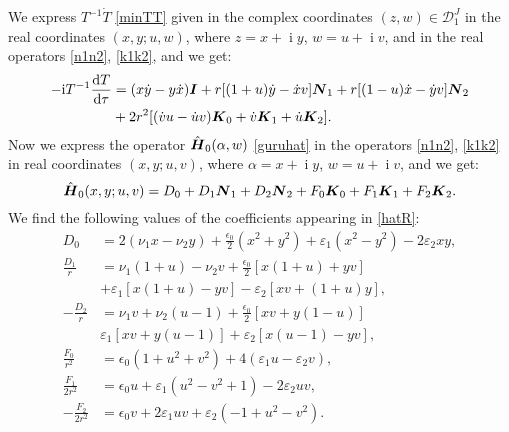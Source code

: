 \documentclass[12pt]{amsart}
\numberwithin{equation}{section}
\theoremstyle{definition}
\begin{document}
We express  $T^{-1}\dot{T}$ \eqref{minTT}  given in the complex
coordinates $(z,w)\in{{\mathcal{{D}}}}^J_1$ in the real coordinates $(x,y;u,w)$,
where 
$z=x+{\operatorname{i}} y$, $w=u+{\operatorname{i}} v$, and in the real operators \eqref{n1n2}, \eqref{k1k2}, and we get:
\begin{equation}\label{minTT1}
\begin{split}
-{\operatorname{i}} T^{-1}\frac{{\operatorname{d}} T}{{\operatorname{d}} \tau } & =(x\dot{y}-y\dot{x}){{\mbox{\boldmath{${I}$}}}}+r[(1+u)\dot{y}-\dot{x}v]{{\mbox{\boldmath{${N}$}}}}_1+r[(1-u)\dot{x}-\dot{y}v]{{\mbox{\boldmath{${N}$}}}}_2\\
~~~&  +2r^2[(\dot{v}u-\dot{u}v){{\mbox{\boldmath{${K}$}}}}_0+\dot{v}{{\mbox{\boldmath{${K}$}}}}_1+\dot{u}{{\mbox{\boldmath{${K}$}}}}_2].
\end{split}
\end{equation}
Now we express  the operator $\hat{{{\mbox{\boldmath{${H}$}}}}}_0(\alpha,w)$ \eqref{guruhat} in the
operators \eqref{n1n2}, \eqref{k1k2} in real coordinates $(x,y;u,v)$, where
$\alpha=x+{\operatorname{i}} y$, $w=u+{\operatorname{i}} v$, and we get:
\begin{equation}\label{hatR}
\hat{{{\mbox{\boldmath{${H}$}}}}}_0(x,y;u,v)=D_0+D_1{{\mbox{\boldmath{${N}$}}}}_1+ D_2{{\mbox{\boldmath{${N}$}}}}_2+F_0{{\mbox{\boldmath{${K}$}}}}_0+ F_1{{\mbox{\boldmath{${K}$}}}}_1+F_2{{\mbox{\boldmath{${K}$}}}}_2.
\end{equation}
We find the following values of the coefficients appearing in  \eqref{hatR}:
\begin{equation}
\begin{split}\label{h2r}
D_0 &= 2(\nu_1x-\nu_2y)+\frac{\epsilon_0}{2}(x^2+y^2)+\varepsilon_1(x^2-y^2)-2\varepsilon_2 xy,\\
\frac{D_1}{r} &=\nu_1(1+u)-\nu_2v+\frac{\epsilon_0}{2}[x(1+u)+yv]\\~~~&+\varepsilon_1[x(1+u)-yv] -\varepsilon_2[xv+(1+u)y],
\\-\frac{D_2}{r} &= \nu_1v+\nu_2(u-1)+\frac{\epsilon_0}{2}[xv+y(1-u)] \\~~~&\varepsilon_1[xv+y(u-1)]
+\varepsilon_2[x(u-1)-yv],\\
\frac{F_0}{r^2} & =\epsilon_0(1+u^2+v^2)+4(\varepsilon_1u-\varepsilon_2v),\\
\frac{F_1}{2r^2} &
=\epsilon_0u+\varepsilon_1(u^2-v^2+1)-2\varepsilon_2uv,\\
-\frac{F_2}{2r^2} & =\epsilon_0v+2\varepsilon_1uv+\varepsilon_2(-1+u^2-v^2).
\end{split}
\end{equation}
\end{document}
